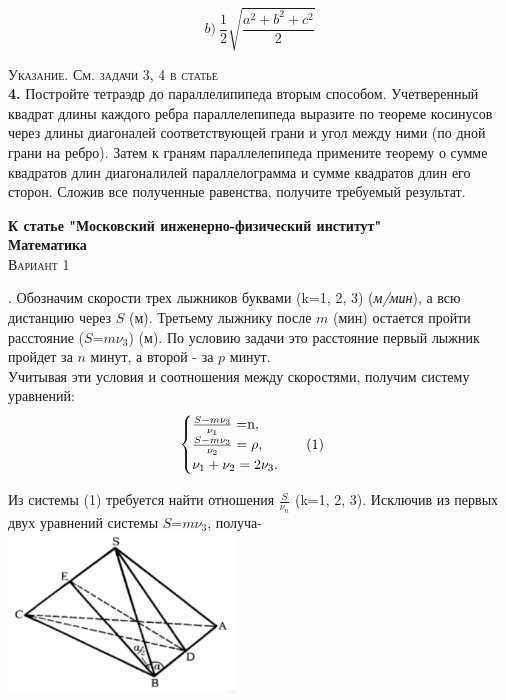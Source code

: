\begin{multicols}{2}

\begin{equation*}
b)~\frac{1}{2} \sqrt{\frac{a^2 + b^2 + c^2}{2}}
\end{equation*}

\textsc{Указание. См. задачи 3, 4 в статье }\\
\indent \textbf{4. } Постройте тетраэдр до параллелипипеда вторым способом. 
Учетверенный квадрат длины каждого ребра параллелепипеда выразите по теореме косинусов через длины диагоналей
соответствующей грани и угол между ними (по дной грани на ребро).
Затем к граням параллелепипеда примените теорему о сумме квадратов длин диагоналилей параллелограмма
и сумме квадратов длин его сторон. Сложив все полученные равенства, получите требуемый результат. 

\vspace{0.5cm}
\begin{flushleft}
\textbf{К статье "Московский инженерно-физический институт"}\\
\vspace{0.2cm}
\textbf{Математика}\\
\vspace{0.2cm}
\textsc{Вариант 1}
\end{flushleft}

. Обозначим скорости трех лыжников буквами (k=1, 2, 3) (\textit{м/мин}), а всю дистанцию через $S$ (м).
Третьему лыжнику после $m$ (мин) остается пройти расстояние ($S$=$m\nu_3$) (м).
По условию задачи это расстояние первый лыжник пройдет за $n$ минут, а второй - за $p$ минут.\\
\indent Учитывая эти условия и соотношения между скоростями, получим систему уравнений:
\begin{equation*}
 \begin{cases}
   \frac{S-m\nu_3}{\nu_1} = $n$,\\
   \frac{S-m\nu_3}{\nu_2} = \rho, \indent \indent (1) \\
   \nu_1 + \nu_2 = 2\nu_3.
 \end{cases}
\end{equation*}

Из системы (1) требуется найти отношения $\frac{S}{\nu_n}$
(k=1, 2, 3). Исключив из первых двух уравнений системы $S$=$m\nu_3$, получа-\\
\includegraphics[width=0.45\textwidth]{scheme.png}



\end{multicols}
